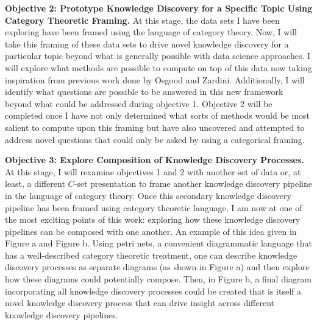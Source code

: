 \documentclass[11pt]{extarticle}
\begin{document}
\textbf{Objective 2: Prototype Knowledge Discovery for a Specific Topic Using Category Theoretic Framing.} At this stage, the data sets I have been exploring have been framed using the language of category theory.
Now, I will take this framing of these data sets to drive novel knowledge discovery for a particular topic beyond what is generally possible with data science approaches.
I will explore what methods are possible to compute on top of this data now taking inspiration from previous work done by Osgood and Zardini. %
Additionally, I will identify what questions are possible to be answered in this new framework beyond what could be addressed during objective 1.
Objective 2 will be completed once I have not only determined what sorts of methods would be most salient to compute upon this framing but have also uncovered and attempted to address novel questions that could only be asked by using a categorical framing.

\textbf{Objective 3: Explore Composition of Knowledge Discovery Processes.} At this stage, I will rexamine objectives 1 and 2 with another set of data or, at least, a different $C$-set presentation to frame another knowledge discovery pipeline in the language of category theory.
Once this secondary knowledge discovery pipeline has been framed using category theoretic language, I am now at one of the most exciting points of this work: exploring how these knowledge discovery pipelines can be composed with one another.
An example of this idea given in Figure a and Figure b.
Using petri nets, a convenient diagrammatic language that has a well-described category theoretic treatment, one can describe knowledge discovery processes as separate diagrams (as shown in Figure a) and then explore how these diagrams could potentially compose.
Then, in Figure b, a final diagram incorporating all knowledge discovery processes could be created that is itself a novel knowledge discovery process that can drive insight across different knowledge discovery pipelines.
\end{document}
